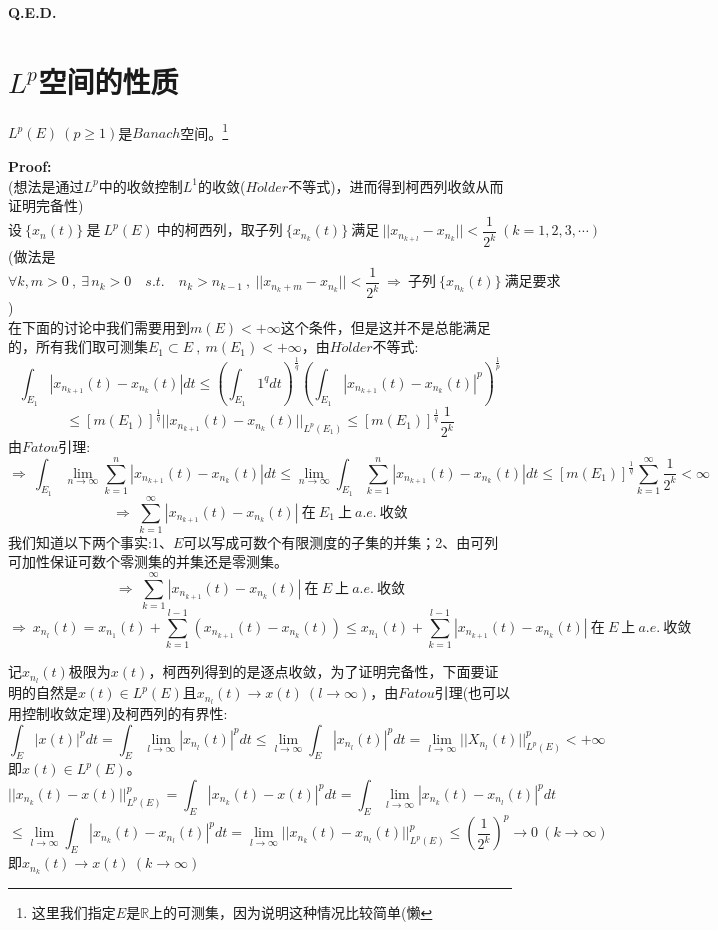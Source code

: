 \textbf{Q.E.D.}

\section{$L^p$空间的性质}
\begin{theorem}
    $L^p(E) \ (p \geq 1)$是$Banach$空间。\footnote{这里我们指定$E$是$\mathbb{R}$上的可测集，因为说明这种情况比较简单(懒}
\end{theorem}
\textbf{Proof:} \\
(想法是通过$L^p$中的收敛控制$L^1$的收敛($H\ddot{o}lder$不等式)，进而得到柯西列收敛从而证明完备性)
\[\text{设} \ \{x_n(t)\} \ \text{是} \ L^p(E) \ \text{中的柯西列，取子列} \ \{x_{n_k}(t)\} \ \text{满足} \ ||x_{n_{k+l}}-x_{n_k}||<\frac{1}{2^k} \ (k=1,2,3,\cdots)\]
(做法是
\[\forall k,m>0 \ , \ \exists \, n_k>0 \quad s.t. \quad n_{k}>n_{k-1} \ , \ ||x_{n_k+m}-x_{n_k}||<\frac{1}{2^k} \ \Rightarrow \ \text{子列} \ \{x_{n_k}(t)\} \ \text{满足要求}\]
)\\
在下面的讨论中我们需要用到$m(E)<+\infty$这个条件，但是这并不是总能满足的，所有我们取可测集$E_1 \subset E \ , \ m(E_1)<+\infty$，由$H\ddot{o}lder$不等式:
\[\int_{E_1}|x_{n_{k+1}}(t)-x_{n_k}(t)|dt \leq \left(\int_{E_1}1^qdt\right)^{\frac{1}{q}}\left(\int_{E_1}|x_{n_{k+1}}(t)-x_{n_k}(t)|^p\right)^{\frac{1}{p}}\]
\[\leq \left[m(E_1)\right]^{\frac{1}{q}}||x_{n_{k+1}}(t)-x_{n_k}(t)||_{L^p(E_1)} \leq \left[m(E_1)\right]^{\frac{1}{q}}\frac{1}{2^k}\]
由$Fatou$引理:
\[\Rightarrow \ \int_{E_1} \lim_{n \to \infty}\sum_{k=1}^n|x_{n_{k+1}}(t)-x_{n_k}(t)|dt \leq \lim_{n \to \infty} \int_{E_1} \sum_{k=1}^n|x_{n_{k+1}}(t)-x_{n_k}(t)|dt \leq \left[m(E_1)\right]^{\frac{1}{q}}\sum_{k=1}^{\infty}\frac{1}{2^k}<\infty\]
\[\Rightarrow \ \sum_{k=1}^{\infty}|x_{n_{k+1}}(t)-x_{n_k}(t)| \ \text{在} \ E_1 \ \text{上} \ a.e. \ \text{收敛}\]
我们知道以下两个事实:1、$E$可以写成可数个有限测度的子集的并集；2、由可列可加性保证可数个零测集的并集还是零测集。
\[\Rightarrow \ \sum_{k=1}^{\infty}|x_{n_{k+1}}(t)-x_{n_k}(t)| \ \text{在} \ E \ \text{上} \ a.e. \ \text{收敛}\]
\[\Rightarrow \ x_{n_l}(t)=x_{n_1}(t)+\sum_{k=1}^{l-1}\left(x_{n_{k+1}}(t)-x_{n_k}(t)\right) \leq x_{n_1}(t)+\sum_{k=1}^{l-1}|x_{n_{k+1}}(t)-x_{n_k}(t)| \ \text{在} \ E \ \text{上} \ a.e. \ \text{收敛}\]

记$x_{n_l}(t)$极限为$x(t)$，柯西列得到的是逐点收敛，为了证明完备性，下面要证明的自然是$x(t) \in L^p(E)$且$x_{n_l}(t) \to x(t) \ (l \to \infty)$，由$Fatou$引理(也可以用控制收敛定理)及柯西列的有界性:
\[\int_E|x(t)|^pdt=\int_E\lim_{l \to \infty}|x_{n_l}(t)|^pdt \leq \lim_{l \to \infty}\int_E|x_{n_l}(t)|^pdt=\lim_{l \to \infty}||X_{n_l}(t)||^p_{L^p(E)}<+\infty\]
即$x(t) \in L^p(E)$。
\[||x_{n_k}(t)-x(t)||^p_{L^p(E)}=\int_E|x_{n_k}(t)-x(t)|^pdt=\int_E\lim_{l \to \infty}|x_{n_k}(t)-x_{n_l}(t)|^pdt\]
\[\leq \lim_{l \to \infty}\int_E|x_{n_k}(t)-x_{n_l}(t)|^pdt=\lim_{l \to \infty}||x_{n_k}(t)-x_{n_l}(t)||^p_{L^p(E)} \leq \left(\frac{1}{2^k}\right)^p \to 0 \ (k \to \infty)\]
即$x_{n_k}(t) \to x(t) \ (k \to \infty)$


